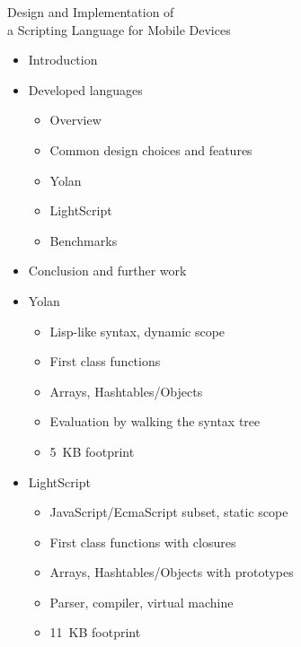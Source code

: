 \documentclass[a4paper,landscape]{slides}
\begin{document}
\begin{slide}
        {\large Design and Implementation of \\ a Scripting Language for Mobile Devices \\ \mbox{}}
\begin{itemize}\addtolength{\itemsep}{-\baselineskip}
\item Introduction 
\item Developed languages 
        \begin{itemize}\addtolength{\itemsep}{-\baselineskip}
            \item Overview
            \item Common design choices and features
            \item Yolan
            \item LightScript
            \item Benchmarks
        \end{itemize}
\item Conclusion and further work 
\end{itemize}
\end{slide}

\begin{slide}
	\begin{itemize} 
	\item Yolan
	\begin{itemize} \setlength{\itemsep}{-3mm}
            \item Lisp-like syntax, dynamic scope
            \item First class functions
            \item Arrays, Hashtables/Objects 
            \item Evaluation by walking the syntax tree
            \item 5~KB footprint
        \end{itemize}
	\item LightScript
	\begin{itemize} \setlength{\itemsep}{-3mm}
            \item JavaScript/EcmaScript subset, static scope
            \item First class functions with closures
            \item Arrays, Hashtables/Objects with prototypes
            \item Parser, compiler, virtual machine
            \item 11~KB footprint
	\end{itemize}
	\end{itemize}
\end{slide}
\end{document}
